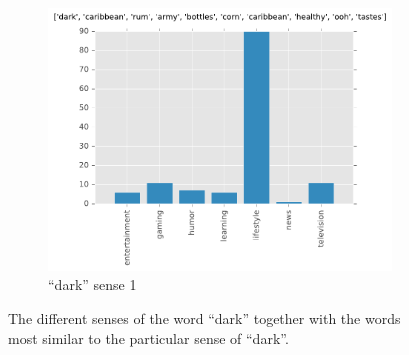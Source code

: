 \begin{landscape}
\begin{figure}[H]
\begin{subfigure}[t]{.3\textwidth}
\centering\includegraphics[]{figures/reddit-dark-6.pdf}
\caption{``dark'' sense 1}
\label{fig-reddit-dark-7}
\end{subfigure}
\caption{The different senses of the word ``dark'' together with the words most similar to the particular sense of ``dark''.}
\label{fig-reddit-dark} 
\end{figure}


\end{landscape}
